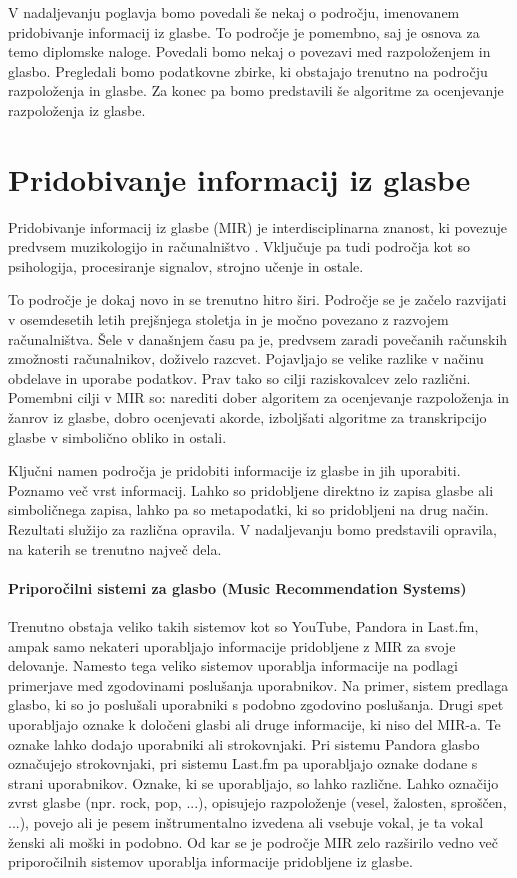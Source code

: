 \documentclass[a4paper, 12pt]{book}
\begin{document}
{V nadaljevanju poglavja bomo povedali še nekaj o področju, imenovanem pridobivanje informacij iz glasbe. To področje je pomembno, saj je osnova za temo diplomske naloge. Povedali bomo nekaj o povezavi med razpoloženjem in glasbo. Pregledali bomo podatkovne zbirke, ki obstajajo trenutno na področju razpoloženja in glasbe. Za konec pa bomo predstavili še algoritme za ocenjevanje razpoloženja iz glasbe. 

\section{Pridobivanje informacij iz glasbe}

Pridobivanje informacij iz glasbe (MIR) je interdisciplinarna znanost, ki povezuje predvsem muzikologijo in računalništvo \cite{pesek2012prepoznavanje}. Vključuje pa tudi področja kot so psihologija, procesiranje signalov, strojno učenje in ostale. 

To področje je dokaj novo in se trenutno hitro širi. Področje se je začelo razvijati v osemdesetih letih prejšnjega stoletja in je močno povezano z razvojem računalništva. Šele v današnjem času pa je, predvsem zaradi povečanih računskih zmožnosti računalnikov, doživelo razcvet. Pojavljajo se velike razlike v načinu obdelave in uporabe podatkov. Prav tako so cilji raziskovalcev zelo različni. Pomembni cilji v MIR so: narediti dober algoritem za ocenjevanje razpoloženja in žanrov iz glasbe, dobro ocenjevati akorde, izboljšati algoritme za transkripcijo glasbe v simbolično obliko in ostali. 

Ključni namen področja je pridobiti informacije iz glasbe in jih uporabiti. Poznamo več vrst informacij. Lahko so pridobljene direktno iz zapisa glasbe ali simboličnega zapisa, lahko pa so metapodatki, ki so pridobljeni na drug način. Rezultati služijo za različna opravila. V nadaljevanju bomo predstavili opravila, na katerih se trenutno največ dela.

\paragraph{Priporočilni sistemi za glasbo (Music Recommendation Systems)}

Trenutno obstaja veliko takih sistemov kot so YouTube, Pandora in Last.fm, ampak samo nekateri uporabljajo informacije pridobljene z MIR za svoje delovanje. Namesto tega veliko sistemov uporablja informacije na podlagi primerjave med zgodovinami poslušanja uporabnikov. Na primer, sistem predlaga glasbo, ki so jo poslušali uporabniki s podobno zgodovino poslušanja. Drugi spet uporabljajo oznake k določeni glasbi ali druge informacije, ki niso del MIR-a. Te oznake lahko dodajo uporabniki ali strokovnjaki. Pri sistemu Pandora glasbo označujejo strokovnjaki, pri sistemu Last.fm pa uporabljajo oznake dodane s strani uporabnikov. Oznake, ki se uporabljajo, so lahko različne. Lahko označijo zvrst glasbe (npr. rock, pop, ...), opisujejo razpoloženje (vesel, žalosten, sproščen, ...), povejo ali je pesem inštrumentalno izvedena ali vsebuje vokal, je ta vokal ženski ali moški in podobno. Od kar se je področje MIR zelo razširilo vedno več priporočilnih sistemov uporablja informacije pridobljene iz glasbe. 
 
}
\end{document}
